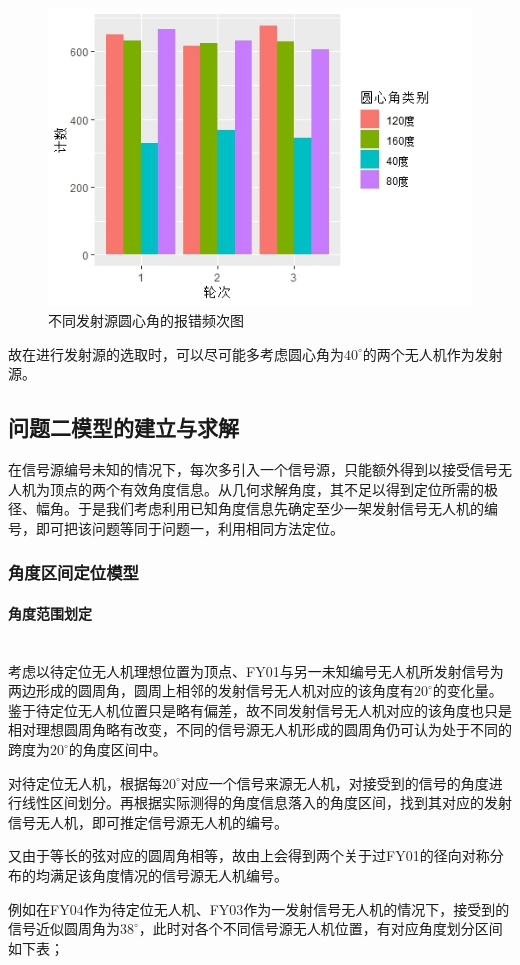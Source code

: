 \documentclass{ctexart}
\newcommand{\subsubsubsection}[1]{\paragraph{#1}\mbox{}\\}
\begin{document}
\begin{figure}[H]
  \centering
  \includegraphics[width=0.55\linewidth]{pic/Rplot01.jpeg}
  \caption{不同发射源圆心角的报错频次图}
  \label{不同发射源圆心角的报错频次图}
  \end{figure}



故在进行发射源的选取时，可以尽可能多考虑圆心角为$40^{\circ}$的两个无人机作为发射源。


\subsection{问题二模型的建立与求解}

在信号源编号未知的情况下，每次多引入一个信号源，只能额外得到以接受信号无人机为顶点的两个有效角度信息。从几何求解角度，其不足以得到定位所需的极径、幅角。于是我们考虑利用已知角度信息先确定至少一架发射信号无人机的编号，即可把该问题等同于问题一，利用相同方法定位。

\subsubsection{角度区间定位模型}

\subsubsubsection{角度范围划定}
考虑以待定位无人机理想位置为顶点、FY01与另一未知编号无人机所发射信号为两边形成的圆周角，圆周上相邻的发射信号无人机对应的该角度有$20^{\circ}$的变化量。鉴于待定位无人机位置只是略有偏差，故不同发射信号无人机对应的该角度也只是相对理想圆周角略有改变，不同的信号源无人机形成的圆周角仍可认为处于不同的跨度为$20^{\circ}$的角度区间中。

对待定位无人机，根据每$20^{\circ}$对应一个信号来源无人机，对接受到的信号的角度进行线性区间划分。再根据实际测得的角度信息落入的角度区间，找到其对应的发射信号无人机，即可推定信号源无人机的编号。

又由于等长的弦对应的圆周角相等，故由上会得到两个关于过FY01的径向对称分布的均满足该角度情况的信号源无人机编号。

例如在FY04作为待定位无人机、FY03作为一发射信号无人机的情况下，接受到的信号近似圆周角为$38^{\circ}$，此时对各个不同信号源无人机位置，有对应角度划分区间如下表；
\end{document}
